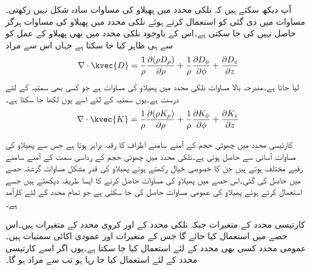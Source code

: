 آپ دیکھ سکتے ہیں کہ نلکی محدد میں پھیلاو کی مساوات سادہ شکل نہیں رکھتی۔مساوات  میں دی گئی  کو استعمال کرتے ہوئے نلکی محدد میں پھیلاو کی مساوات ہرگز حاصل نہیں کی جا سکتی ہے۔اس کے باوجود نلکی محدد میں بھی پھیلاو کے عمل کو  سے ہی ظاہر کیا جا سکتا ہے جہاں اس سے مراد
\begin{align}\label{مساوات_گاوس_نلکی_پھیلاو}
\nabla \cdot \kvec{D}=\frac{1}{\rho}\frac{\partial (\rho D_{\rho})}{\partial \rho}+\frac{1}{\rho}\frac{\partial D_{\phi}}{\partial \phi}  +  \frac{\partial D_{z}}{\partial z}
\end{align}
لیا جاتا ہے۔مندرجہ بالا مساوات نلکی محدد میں پھیلاو کی مساوات ہے جو کسی بھی سمتیہ کے لئے درست ہے۔یوں سمتیہ  کے لئے اسے یوں لکھا جا سکتا ہے۔
 \begin{align}\label{مساوات_گاوس_نلکی_عمومی_پھیلاو}
\nabla \cdot \kvec{K}=\frac{1}{\rho}\frac{\partial (\rho K_{\rho})}{\partial \rho}+\frac{1}{\rho}\frac{\partial K_{\phi}}{\partial \phi}  +  \frac{\partial K_{z}}{\partial z}
\end{align}


کارتیسی محدد میں چھوٹی حجم کے آمنے سامنے اطراف کا رقبہ برابر ہوتا ہے جس سے پھیلاو کی مساوات آسانی سے حاصل ہوتی ہے۔نلکی محدد میں چھوٹی حجم کے رداسی سمت کے آمنے سامنے رقبے مختلف ہوتے ہیں جن کا خصوصی خیال رکھتے ہوئے پھیلاو کی قدر مشکل مساوات گزشتہ حصے میں حاصل کی گئی۔اس حصے میں پھیلاو کی مساوات حاصل کرنے کا ایسا طریقہ دیکھتے ہیں جسے استعمال کرتے ہوئے پھیلاو کی عمومی مساوات حاصل کی جا سکتی ہے جو تمام محدد کے لئے کارآمد ہے۔

کارتیسی محدد کے متغیرات  جبکہ نلکی محدد کے   اور کروی محدد  کے متغیرات  ہیں۔اس حصے میں   استعمال کیا جائے گا جس کے متغیرات   اور  عمودی اکائی سمتیات  ہیں۔عمومی محدد کسی بھی محدد کے لئے استعمال کیا جا سکتا ہے۔یوں اگر اسے کارتیسی محدد کے لئے استعمال کیا جا رہا ہو تب   سے مراد  ہو گا۔
 
